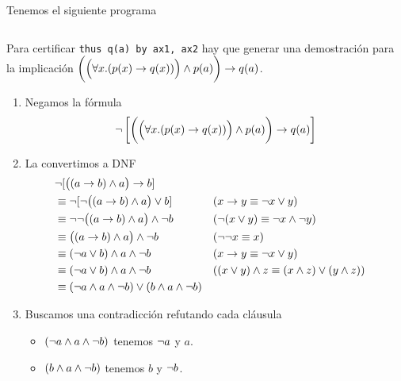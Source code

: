 \begin{ejemplo}
    Tenemos el siguiente programa

    \begin{figure}[H]
        \centering
        \begin{tabular}{c}
            
        \end{tabular}
    \end{figure}

    Para certificar \lstinline{thus q(a) by ax1, ax2} hay que generar una
    demostración para la implicación \(
        \bigg(\Big(\forall x. (p(x) \to q(x))\Big) \wedge p(a) \bigg)
        \to q(a)
    \).

    \begin{enumerate}
        \item Negamos la fórmula 
        \[
            \neg \left[
            \bigg(\Big(\forall x. (p(x) \to q(x))\Big) \wedge p(a) \bigg)
            \to q(a)
        \right]
        \]

        \item La convertimos a DNF
        \begin{align*}
            &\neg [ \big( (a \to b) \wedge a \big) \to b ] \\
            &\equiv \neg [ \neg \big( (a \to b) \wedge a \big) \vee b ]
                && (x \to y \equiv \neg x \vee y)\\
            &\equiv \neg \neg \big( (a \to b) \wedge a \big) \wedge \neg b
                && (\neg(x \vee y) \equiv \neg x \wedge \neg y)\\
            &\equiv \big( (a \to b) \wedge a \big) \wedge \neg b
                && (\neg\neg x \equiv x)\\
            &\equiv (\neg a \vee b) \wedge a \wedge \neg b
                 && (x \to y \equiv \neg x \vee y)\\
            &\equiv (\neg a \vee b) \wedge a \wedge \neg b
                && ((x \vee y) \wedge z \equiv (x \wedge z) \vee (y \wedge z))\\
            &\equiv
                (\neg a \wedge a \wedge \neg b)
                \vee
                (b \wedge a \wedge \neg b)
        \end{align*}

        \item Buscamos una contradicción refutando cada cláusula
        \begin{itemize}
            \item $(\neg a \wedge a \wedge \neg b)$ tenemos $\neg a$ y $a$.
            \item $(b \wedge a \wedge \neg b)$ tenemos $b$ y $\neg b$.
        \end{itemize}
    \end{enumerate}
\end{ejemplo}




